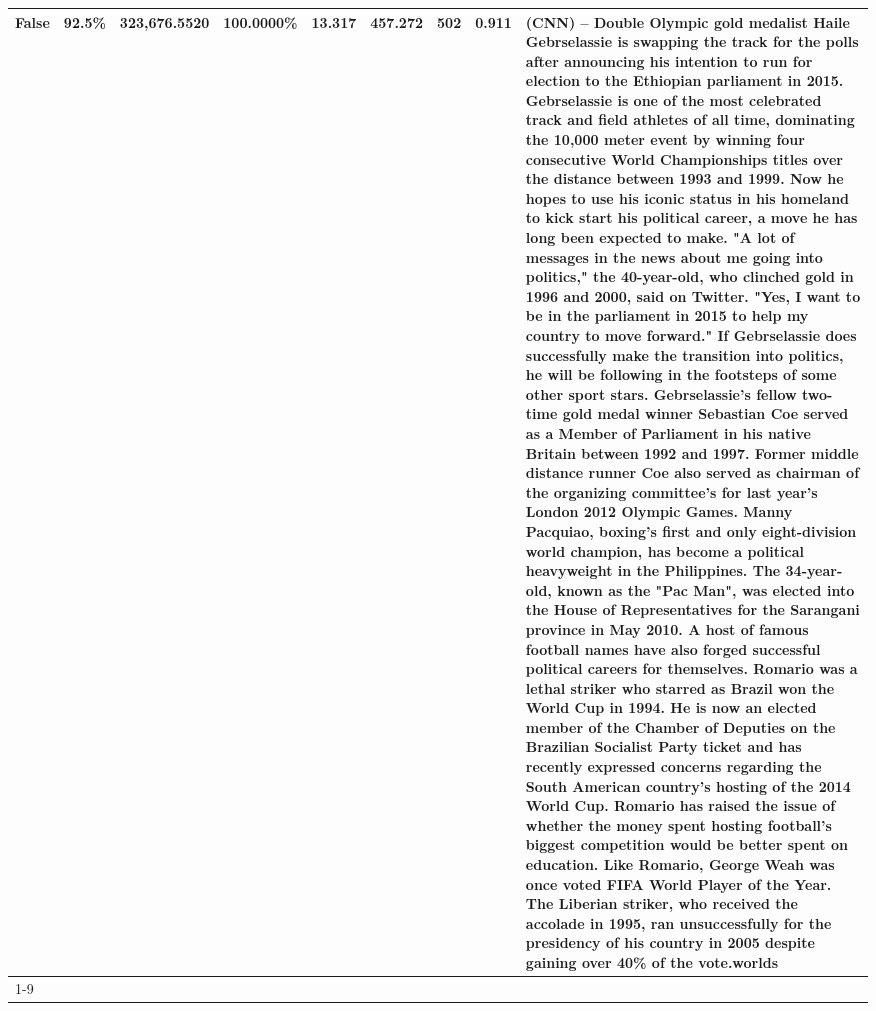 \begin{table}[H]
{\begin{tabular}{lllrlllll}
False & 92.5\% & 323,676.5520 & \bfseries \color{red} 100.0000\% & 13.317 & 457.272 & 502 & 0.911 & (CNN) -- Double Olympic gold medalist Haile Gebrselassie is swapping the track for the polls after announcing his intention to run for election to the Ethiopian parliament in 2015. Gebrselassie is one of the most celebrated track and field athletes of all time, dominating the 10,000 meter event by winning four consecutive World Championships titles over the distance between 1993 and 1999. Now he hopes to use his iconic status in his homeland to kick start his political career, a move he has long been expected to make. "A lot of messages in the news about me going into politics," the 40-year-old, who clinched gold in 1996 and 2000, said on Twitter. "Yes, I want to be in the parliament in 2015 to help my country to move forward." If Gebrselassie does successfully make the transition into politics, he will be following in the footsteps of some other sport stars. Gebrselassie's fellow two-time gold medal winner Sebastian Coe served as a Member of Parliament in his native Britain between 1992 and 1997. Former middle distance runner Coe also served as chairman of the organizing committee's for last year's London 2012 Olympic Games. Manny Pacquiao, boxing's first and only eight-division world champion, has become a political heavyweight in the Philippines. The 34-year-old, known as the "Pac Man", was elected into the House of Representatives for the Sarangani province in May 2010. A host of famous football names have also forged successful political careers for themselves. Romario was a lethal striker who starred as Brazil won the World Cup in 1994. He is now an elected member of the Chamber of Deputies on the Brazilian Socialist Party ticket and has recently expressed concerns regarding the South American country's hosting of the 2014 World Cup. Romario has raised the issue of whether the money spent hosting football's biggest competition would be better spent on education. Like Romario, George Weah was once voted FIFA World Player of the Year. The Liberian striker, who received the accolade in 1995, ran unsuccessfully for the presidency of his country in 2005 despite gaining over 40\% of the vote.worlds \\
\cline{1-9}

\end{tabular}}
\end{table}
